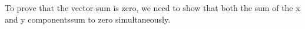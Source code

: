 \documentclass[preview]{standalone}
\begin{document}
\begin{center}
To prove that the vector sum is zero, we need to show that both the sum of the x and y componentssum to zero simultaneously.
\end{center}
\end{document}
